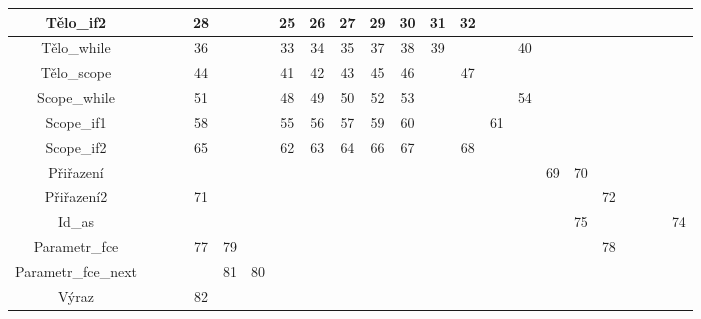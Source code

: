 \documentclass[11pt, a4paper]{article}
\begin{document}
\begin{table}[h]
{{\begin{tabular}{|c|c|c|c|c|c|c|c|c|c|c|c|c|c|c|c|c|c|c|c|c|c|c|}
				Tělo\_if2           &         &          &       & 28 &    &    & 25  & 26 & 27 & 29    & 30    & 31     & 32  &      &      &    &     &         &         &        &        &    \\ \hline
				Tělo\_while         &         &          &       & 36 &    &    & 33  & 34 & 35 & 37    & 38    & 39     &     &      & 40   &    &     &         &         &        &        &    \\ \hline
				Tělo\_scope         &         &          &       & 44 &    &    & 41  & 42 & 43 & 45    & 46    &        & 47  &      &      &    &     &         &         &        &        &    \\ \hline
				Scope\_while        &         &          &       & 51 &    &    & 48  & 49 & 50 & 52    & 53    &        &     &      & 54   &    &     &         &         &        &        &    \\ \hline
				Scope\_if1          &         &          &       & 58 &    &    & 55  & 56 & 57 & 59    & 60    &        &     & 61   &      &    &     &         &         &        &        &    \\ \hline
				Scope\_if2          &         &          &       & 65 &    &    & 62  & 63 & 64 & 66    & 67    &        & 68  &      &      &    &     &         &         &        &        &    \\ \hline
				Přiřazení           &         &          &       &    &    &    &     &    &    &       &       &        &     &      &      & 69 & 70  &         &         &        &        &    \\ \hline
				Přiřazení2          &         &          &       & 71 &    &    &     &    &    &       &       &        &     &      &      &    &     & 72      &         &        &        &    \\ \hline
				Id\_as              &         &          &       &    &    &    &     &    &    &       &       &        &     &      &      &    & 75  &         &         &        &        & 74 \\ \hline
				Parametr\_fce       &         &          &       & 77 & 79 &    &     &    &    &       &       &        &     &      &      &    &     & 78      &         &        &        &    \\ \hline
				Parametr\_fce\_next &         &          &       &    & 81 & 80 &     &    &    &       &       &        &     &      &      &    &     &         &         &        &        &    \\ \hline
				Výraz               &         &          &       & 82 &    &    &     &    &    &       &       &        &     &      &      &    &     &         &         &        &        &    \\ \hline

\end{tabular}}}
\end{table}
\end{document}
